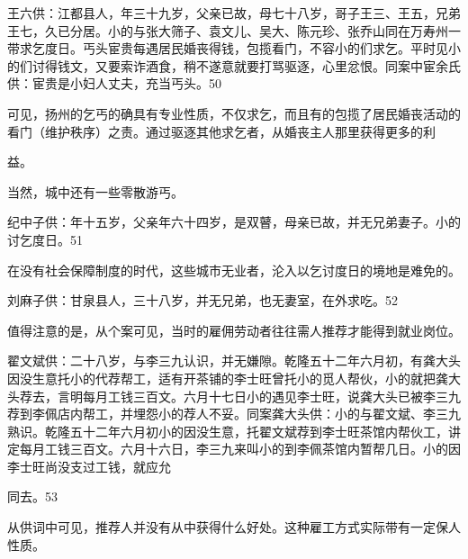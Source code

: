 王六供：江都县人，年三十九岁，父亲已故，母七十八岁，哥子王三、王五，兄弟王七，久已分居。小的与张大筛子、袁文儿、吴大、陈元珍、张乔山同在万寿州一带求乞度日。丐头宦贵每遇居民婚丧得钱，包揽看门，不容小的们求乞。平时见小的们讨得钱文，又要索诈酒食，稍不遂意就要打骂驱逐，心里忿恨。同案中宦余氏供：宦贵是小妇人丈夫，充当丐头。50

可见，扬州的乞丐的确具有专业性质，不仅求乞，而且有的包揽了居民婚丧活动的看门（维护秩序）之责。通过驱逐其他求乞者，从婚丧主人那里获得更多的利

\vfill
\begin{BookNotes}
\end{BookNotes}

\noindent 益。

当然，城中还有一些零散游丐。

\begin{BookQuote}
纪中子供：年十五岁，父亲年六十四岁，是双瞽，母亲已故，并无兄弟妻子。小的讨乞度日。51
\end{BookQuote}

在没有社会保障制度的时代，这些城市无业者，沦入以乞讨度日的境地是难免的。

\begin{BookQuote}
刘麻子供：甘泉县人，三十八岁，并无兄弟，也无妻室，在外求吃。52
\end{BookQuote}

值得注意的是，从个案可见，当时的雇佣劳动者往往需人推荐才能得到就业岗位。

\begin{BookQuote}
翟文斌供：二十八岁，与李三九认识，并无嫌隙。乾隆五十二年六月初，有龚大头因没生意托小的代荐帮工，适有开茶铺的李士旺曾托小的觅人帮伙，小的就把龚大头荐去，言明每月工钱三百文。六月十七日小的遇见李士旺，说龚大头已被李三九荐到李佩店内帮工，并埋怨小的荐人不妥。同案龚大头供：小的与翟文斌、李三九熟识。乾隆五十二年六月初小的因没生意，托翟文斌荐到李士旺茶馆内帮伙工，讲定每月工钱三百文。六月十六日，李三九来叫小的到李佩茶馆内暂帮几日。小的因李士旺尚没支过工钱，就应允
\end{BookQuote}

同去。53

从供词中可见，推荐人并没有从中获得什么好处。这种雇工方式实际带有一定保人性质。

